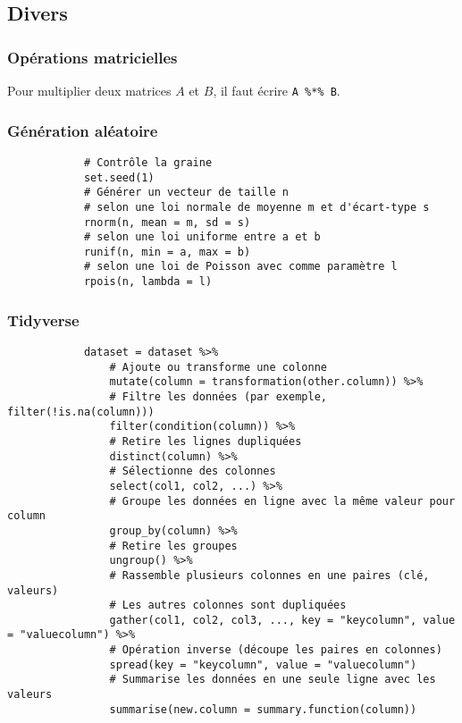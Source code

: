 \subsection{Divers}
    \subsubsection{Opérations matricielles}
        Pour multiplier deux matrices \(A\) et \(B\), il faut écrire \lstinline{A %*% B}.

    \subsubsection{Génération aléatoire}
        \begin{lstlisting}
            # Contrôle la graine
            set.seed(1)
            # Générer un vecteur de taille n
            # selon une loi normale de moyenne m et d'écart-type s
            rnorm(n, mean = m, sd = s)
            # selon une loi uniforme entre a et b
            runif(n, min = a, max = b)
            # selon une loi de Poisson avec comme paramètre l
            rpois(n, lambda = l)
        \end{lstlisting}

    \subsubsection{Tidyverse}
        \begin{lstlisting}
            dataset = dataset %>%
                # Ajoute ou transforme une colonne
                mutate(column = transformation(other.column)) %>%
                # Filtre les données (par exemple, filter(!is.na(column)))
                filter(condition(column)) %>%
                # Retire les lignes dupliquées
                distinct(column) %>%
                # Sélectionne des colonnes
                select(col1, col2, ...) %>%
                # Groupe les données en ligne avec la même valeur pour column
                group_by(column) %>%
                # Retire les groupes
                ungroup() %>%
                # Rassemble plusieurs colonnes en une paires (clé, valeurs)
                # Les autres colonnes sont dupliquées
                gather(col1, col2, col3, ..., key = "keycolumn", value = "valuecolumn") %>%
                # Opération inverse (découpe les paires en colonnes)
                spread(key = "keycolumn", value = "valuecolumn")
                # Summarise les données en une seule ligne avec les valeurs
                summarise(new.column = summary.function(column))
        \end{lstlisting}

